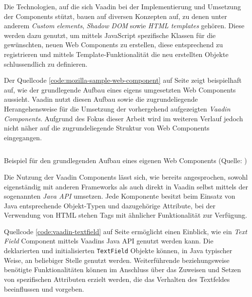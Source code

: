 \documentclass[a4paper,12pt,twoside]{scrreprt}
\begin{document}
Die Technologien, auf die sich Vaadin bei der Implementierung und Umsetzung der Components stützt, bauen auf diversen Konzepten auf, zu denen unter anderem \textit{Custom elements}, \textit{Shadow DOM} sowie \textit{HTML templates} gehören. Diese werden dazu genutzt, um mittels JavaScript spezifische Klassen für die gewünschten, neuen Web Components zu erstellen, diese entsprechend zu registrieren und mittels Template-Funktionalität die neu erstellten Objekte schlussendlich zu definieren. \parencite[][]{mozilla_contributors_web_2021}

\medskip

Der Quellcode \ref{code:mozilla-sample-web-component} auf Seite \pageref{code:mozilla-sample-web-component} zeigt beispielhaft auf, wie der grundlegende Aufbau eines eigens umgesetzten Web Components aussieht. Vaadin nutzt diesen Aufbau sowie die zugrundeliegende Herangehensweise für die Umsetzung der vorhergehend aufgezeigten \textit{Vaadin Components}. \parencite[vgl.][]{vaadin_ltd_vaadin-text-fieldjs_2021} Aufgrund des Fokus dieser Arbeit wird im weiteren Verlauf jedoch nicht näher auf die zugrundeliegende Struktur von Web Components eingegangen.

\begin{listing}[ht]
    \inputminted[fontsize=\footnotesize,linenos]{js}{code/web_components_mozilla.js}
    \caption[Beispiel für den grundlegenden Aufbau eines eigenen Web Components]{Beispiel für den grundlegenden Aufbau eines eigenen Web Components (Quelle: \cite[][]{mozilla_contributors_using_2021})}
    \label{code:mozilla-sample-web-component}
\end{listing}

Die Nutzung der Vaadin Components lässt sich, wie bereits angesprochen, sowohl eigenständig mit anderen Frameworks als auch direkt in Vaadin selbst mittels der sogenannten \textit{Java API} umsetzen. Jede Komponente besitzt beim Einsatz von Java entsprechende Objekt-Typen und dazugehörige Attribute, bei der Verwendung von HTML stehen Tags mit ähnlicher Funktionalität zur Verfügung. \parencite[][]{vaadin_ltd_mobile_nodate}

\medskip

Quellcode \ref{code:vaadin-textfield} auf Seite \pageref{code:vaadin-textfield} ermöglicht einen Einblick, wie ein \textit{Text Field} Component mittels Vaadins Java API genutzt werden kann. Die deklarierten und initialisierten \texttt{TextField} Objekte können, in Java typischer Weise, an beliebiger Stelle genutzt werden. Weiterführende beziehungsweise benötigte Funktionalitäten können im Anschluss über das Zuweisen und Setzen von spezifischen Attributen erzielt werden, die das Verhalten des Textfeldes beeinflussen und vorgeben.
\end{document}
